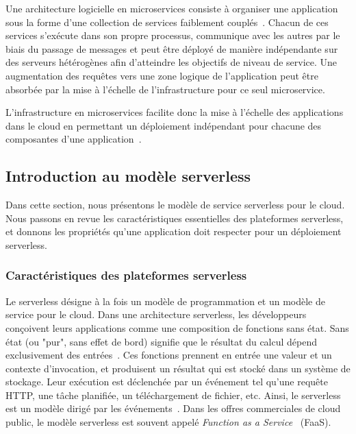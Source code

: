 Une architecture logicielle en microservices consiste à organiser une application sous la forme d'une collection de services faiblement couplés~\cite{12factor}. Chacun de ces services s'exécute dans son propre processus, communique avec les autres par le biais du passage de messages et peut être déployé de manière indépendante sur des serveurs hétérogènes afin d'atteindre les objectifs de niveau de service. Une augmentation des requêtes vers une zone logique de l'application peut être absorbée par la mise à l'échelle de l'infrastructure pour ce seul microservice.

L'infrastructure en microservices facilite donc la mise à l'échelle des applications dans le cloud en permettant un déploiement indépendant pour chacune des composantes d'une application~\cite{vaneykSPECRGReferenceArchitecture2019}.

\subsection{Introduction au modèle serverless}

Dans cette section, nous présentons le modèle de service serverless pour le cloud. Nous passons en revue les caractéristiques essentielles des plateformes serverless, et donnons les propriétés qu'une application doit respecter pour un déploiement serverless.

\subsubsection{Caractéristiques des plateformes serverless}

Le serverless désigne à la fois un modèle de programmation et un modèle de service pour le cloud. Dans une architecture serverless, les développeurs conçoivent leurs applications comme une composition de fonctions sans état. Sans état (ou "pur", sans effet de bord) signifie que le résultat du calcul dépend exclusivement des entrées~\cite{burckhardtNetheriteEfficientExecution}. Ces fonctions prennent en entrée une valeur et un contexte d'invocation, et produisent un résultat qui est stocké dans un système de stockage. Leur exécution est déclenchée par un événement tel qu'une requête HTTP, une tâche planifiée, un téléchargement de fichier, etc. Ainsi, le serverless est un modèle dirigé par les événements~\cite{SchleierSmith2021WhatSC}. Dans les offres commerciales de cloud public, le modèle serverless est souvent appelé \textit{Function as a Service}~\cite{hellersteinServerlessComputingOne2019} (\gls{FaaS}).

